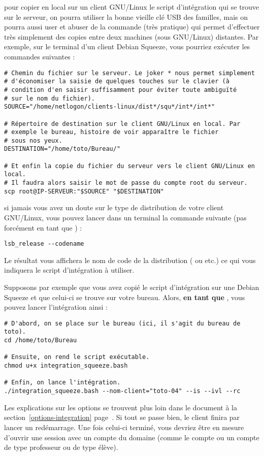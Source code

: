 \begin{RQ}
pour copier en local sur un client GNU/Linux le script d'intégration 
qui se trouve sur le serveur, on
pourra utiliser la bonne vieille clé USB des familles,
mais on pourra aussi user et abuser de
la commande  (très pratique) qui permet d'effectuer
très simplement des copies
entre deux machines (sous GNU/Linux) distantes. Par exemple, sur
le terminal d'un client Debian Squeeze, vous pourriez exécuter
les commandes suivantes :
%
\begin{lstlisting}
# Chemin du fichier sur le serveur. Le joker * nous permet simplement 
# d'économiser la saisie de quelques touches sur le clavier (à
# condition d'en saisir suffisamment pour éviter toute ambiguïté 
# sur le nom du fichier).
SOURCE="/home/netlogon/clients-linux/dist*/squ*/int*/int*"

# Répertoire de destination sur le client GNU/Linux en local. Par
# exemple le bureau, histoire de voir apparaître le fichier
# sous nos yeux.
DESTINATION="/home/toto/Bureau/"

# Et enfin la copie du fichier du serveur vers le client GNU/Linux en local.
# Il faudra alors saisir le mot de passe du compte root du serveur.
scp root@IP-SERVEUR:"$SOURCE" "$DESTINATION"
\end{lstlisting}
%
\end{RQ}

\begin{RQ}
si jamais vous avez un doute sur le type de distribution
de votre client GNU/Linux, vous pouvez lancer dans un terminal
la commande suivante (pas forcément en tant que ) :
%
\begin{lstlisting}
lsb_release --codename
\end{lstlisting}
%
Le résultat vous affichera le nom de code de la distribution
( ou  etc.) ce
qui vous indiquera le script d'intégration à utiliser.
\end{RQ}

Supposons par exemple que vous avez copié le script d'intégration
 sur une Debian Squeeze et
que celui-ci se trouve sur votre bureau.
Alors, \textbf{en tant que }, vous
pouvez lancer l'intégration ainsi :
%
\begin{lstlisting}
# D'abord, on se place sur le bureau (ici, il s'agit du bureau de toto).
cd /home/toto/Bureau

# Ensuite, on rend le script exécutable.
chmod u+x integration_squeeze.bash

# Enfin, on lance l'intégration.
./integration_squeeze.bash --nom-client="toto-04" --is --ivl --rc
\end{lstlisting}
%
Les explications sur les options se trouvent plus loin dans le
document à la section~\ref{options-integration} 
page~\pageref{options-integration}.
Si tout se passe bien, le client finira par lancer un redémarrage. Une
fois celui-ci terminé, vous devriez être en mesure d'ouvrir une
session avec un compte du domaine (comme le compte 
ou un compte de type professeur ou de type élève).

